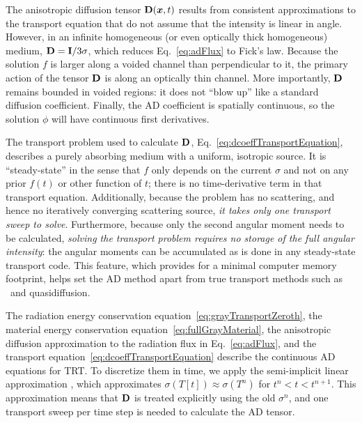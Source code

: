 \documentclass[11pt,letter,twoside]{mc2011}
\begin{document}
The anisotropic diffusion tensor $\mathbf{D}(\bm{x},t)$ results from consistent
approximations to the transport equation that do not assume that the intensity
is linear in angle. However, in an infinite homogeneous (or even optically
thick homogeneous) medium, $\mathbf{D} = \mathbf{I}/3\sigma$, which reduces
Eq.~\eqref{eq:adFlux} to Fick's law. Because the solution $f$ is larger along a
voided channel than perpendicular to it, the primary action of the tensor
$\mathbf{D}$
is along an optically thin channel. More importantly, $\mathbf{D}$ remains bounded
in voided regions: it does not ``blow up'' like a standard diffusion
coefficient. Finally, the AD coefficient is spatially continuous, so the
solution $\phi$ will have continuous first derivatives.

The transport problem used to calculate $\mathbf{D}$,
Eq.~\eqref{eq:dcoeffTransportEquation}, describes a purely absorbing medium
with a uniform, isotropic source. It is ``steady-state'' in the sense that $f$
only depends on the current $\sigma$ and not on any prior $f(t)$ or other
function of $t$; there is no time-derivative term in that transport equation.
Additionally, because the problem has no
scattering, and hence no iteratively converging scattering source, \emph{it
takes only one transport sweep to solve}. Furthermore, because only the second
angular moment needs to be calculated, \emph{solving the transport problem
requires no storage of the full angular intensity}: the angular moments can be
accumulated as is done in any steady-state transport code. This feature, which
provides for a minimal computer memory footprint, helps set the AD method apart
from true transport methods such as \SN\ and quasidiffusion.


The radiation energy conservation equation~\eqref{eq:grayTransportZeroth}, the
material energy conservation equation~\eqref{eq:fullGrayMaterial}, the
anisotropic diffusion approximation to the radiation flux in
Eq.~\eqref{eq:adFlux}, and the transport
equation~\eqref{eq:dcoeffTransportEquation} describe the continuous AD
equations for TRT. To discretize them in time, we apply the semi-implicit
linear approximation \cite{Lar1988}, which approximates $\sigma(T[t]) \approx
\sigma(T^n)$ for $t^n < t < t^{n+1}$. This approximation means that $\mathbf{D}$ is
treated explicitly using the old $\sigma^n$, and one transport sweep per time
step is needed to calculate the AD tensor.
\end{document}
